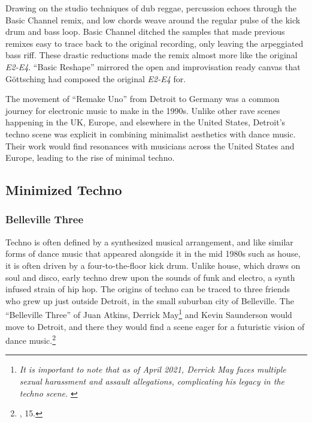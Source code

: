 \documentclass[12pt,twoside]{reedthesis}
\begin{document}
Drawing on the studio techniques of dub reggae, percussion echoes through the Basic Channel remix, and low chords weave around the regular pulse of the kick drum and bass loop. Basic Channel ditched the samples that made previous remixes easy to trace back to the original recording, only leaving the arpeggiated bass riff. These drastic reductions made the remix almost more like the original \emph{E2-E4}. ``Basic Reshape'' mirrored the open and improvisation ready canvas that G{\"o}ttsching had composed the original \emph{E2-E4} for.

The movement of ``Remake Uno'' from Detroit to Germany was a common journey for electronic music to make in the 1990s. Unlike other rave scenes happening in the UK, Europe, and elsewhere in the United States, Detroit's techno scene was explicit in combining minimalist aesthetics with dance music. Their work would find resonances with musicians across the United States and Europe, leading to the rise of minimal techno.

\subsection{Minimized Techno}

\subsubsection{Belleville Three}
Techno is often defined by a synthesized musical arrangement, and like similar forms of dance music that appeared alongside it in the mid 1980s such as house, it is often driven by a four-to-the-floor kick drum. Unlike house, which draws on soul and disco, early techno drew upon the sounds of funk and electro, a synth infused strain of hip hop. The origins of techno can be traced to three friends who grew up just outside Detroit, in the small suburban city of Belleville. The ``Belleville Three'' of Juan Atkins, Derrick May\footnote{\emph{It is important to note that as of April 2021, Derrick May faces multiple sexual harassment and assault allegations, complicating his legacy in the techno scene.} \cite{rossSevenMoreDerrick2021}} and Kevin Saunderson would move to Detroit, and there they would find a scene eager for a futuristic vision of dance music.\footnote{\cite{reynoldsGenerationEcstasyWorld1998}, 15.}
\end{document}
